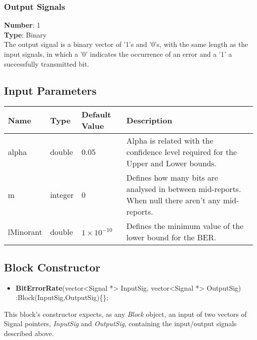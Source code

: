 \begin{refsection}
\subsubsection*{Output Signals}
\hspace*{0.5in}\textbf{Number}: 1\\
\hspace*{0.5in}\textbf{Type}: Binary
\\
The output signal is a binary vector of '1's and '0's, with the same length as the input signals, in which a '0' indicates the occurrence of an error and a '1' a successfully transmitted bit.


\subsection*{Input Parameters}

\begin{table}[H]
\centering
\begin{tabular}{|p{1.5cm}|p{1.5cm}|p{1.5cm}|p{7cm}|}
\hline
\textbf{Name}   & \textbf{Type} & \textbf{Default Value}    & \textbf{Description} \\ \hline
alpha           & double        & 0.05                      & Alpha is related with the confidence level required for the Upper and Lower bounds. \\ \hline
m               & integer       & 0                         & Defines how many bits are analysed in between mid-reports. When null there aren't any mid-reports. \\ \hline
lMinorant       & double        & $1\times10^{-10}$         & Defines the minimum value of the lower bound for the BER.\\ \hline
\end{tabular}
\end{table}


\subsection*{Block Constructor}

\begin{itemize}
  \item \textbf{BitErrorRate}(vector<Signal *> InputSig, vector<Signal *> OutputSig) :Block(InputSig,OutputSig)\{\};
\end{itemize}
This block's constructor expects, as any \textit{Block} object, an input of two vectors of Signal pointers, \textit{InputSig} and \textit{OutputSig}, containing the input/output signals described above.


\end{refsection}
